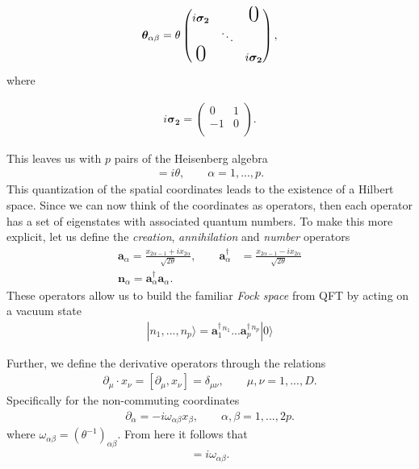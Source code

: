     \begin{align}
        \bm{\theta}_{\alpha \beta } = \theta \begin{pmatrix}
            i \bm{\sigma_2} &  & \text{\huge0} \\
                     & \ddots &  \\
                    \text{\huge0} &  & i \bm{\sigma_2} \\
                \end{pmatrix},
    \end{align}
    where 

    \begin{align}
        i \bm{\sigma_2} = \begin{pmatrix}
            0 & 1 \\
            -1 & 0 \\
        \end{pmatrix}.
    \end{align}

    This leaves us with $p$ pairs of the Heisenberg algebra
    \begin{align}
        [x_{2\alpha -1}, x_{2\alpha}]=i\theta, \qquad \alpha=1,...,p.
    \end{align}
    This quantization of the spatial coordinates leads to the existence of a Hilbert space. Since we can now think of the coordinates as operators, then each operator has a set of eigenstates with associated quantum numbers. To make this more explicit, let us define the \textit{creation}, \textit{annihilation} and \textit{number} operators
    \begin{align}
        \bm{a}_{\alpha} = \frac{x_{2\alpha-1} +i x_{2\alpha}}{\sqrt{2 \theta}}, \qquad \bm{a}^{\dag}_{\alpha} &= \frac{x_{2\alpha-1} -i x_{2\alpha}}{\sqrt{2 \theta}} \\
        \bm{n}_{\alpha} = \bm{a}^{\dag}_{\alpha}\bm{a}_{\alpha}.
    \end{align}
    These operators allow us to build the familiar \textit{Fock space} from QFT by acting on a vacuum state
    \begin{align}
        |n_1,...,n_p\rangle=  \bm{a}^{\dag}_1^{n_1}... \bm{a}^{\dag}_p^{n_p}|0\rangle
    \end{align}

    Further, we define the derivative operators through the relations
    \begin{align}
        \partial_{\mu} \cdot x_{\nu} = [\partial_{\mu}, x_{\nu}] = \delta_{\mu \nu}, \qquad \mu,\nu = 1,...,D.
    \end{align}
    Specifically for the non-commuting coordinates
    \begin{align}
        \partial_{\alpha}= -i \omega_{\alpha \beta} x_{\beta}, \qquad \alpha, \beta = 1,...,2p.
    \end{align}
    where $\omega_{\alpha \beta} = \left(\theta^{-1} \right)_{\alpha \beta}$. From here it follows that
    \begin{align}
        [\partial_{\alpha}, \partial_{\beta}] = i \omega_{\alpha \beta}.
    \end{align}


